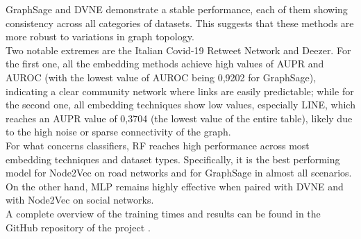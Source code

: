 GraphSage and DVNE demonstrate a stable performance, each of them showing consistency across all categories of datasets. 
This suggests that these methods are more robust to variations in graph topology. 
\\
Two notable extremes are the Italian Covid-19 Retweet Network and Deezer. 
For the first one, all the embedding methods achieve high values of AUPR and AUROC (with the lowest value of AUROC being 0,9202 for GraphSage), indicating a clear community network where links are easily predictable; while for the second one, all embedding techniques show low values, especially LINE, which reaches an AUPR value of 0,3704 (the lowest value of the entire table), likely due to the high noise or sparse connectivity of the graph. 
\\
For what concerns classifiers, RF reaches high performance across most embedding techniques and dataset types. 
Specifically, it is the best performing model for Node2Vec on road networks and for GraphSage in almost all scenarios. 
On the other hand, MLP remains highly effective when paired with DVNE and with Node2Vec on social networks.
\\\newline
A complete overview of the training times and results can be found in the GitHub repository of the project \cite{ProjectRepo}.
